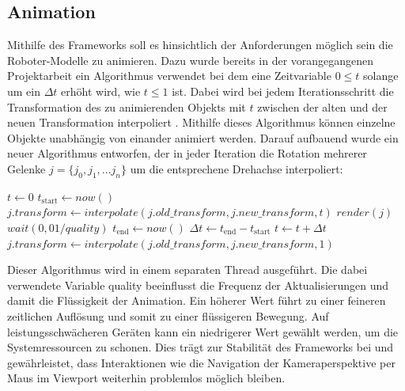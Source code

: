 \subsection{Animation}
Mithilfe des Frameworks soll es hinsichtlich der Anforderungen möglich sein die Ro\-bo\-ter-Modelle zu animieren.
Dazu wurde bereits in der vorangegangenen Projektarbeit ein Algorithmus verwendet bei dem eine
Zeitvariable $0 \leq t$ solange um ein $\Delta t$ erhöht wird, wie $t \leq 1$ ist.
Dabei wird bei jedem Iterationsschritt die Transformation des zu animierenden Objekts mit $t$ zwischen
der alten und der neuen Transformation interpoliert .
Mithilfe dieses Algorithmus können einzelne Objekte unabhängig von einander animiert werden.
Darauf aufbauend wurde ein neuer Algorithmus entworfen, der in jeder Iteration die Rotation
mehrerer Gelenke $j = \{j_0,j_1,...j_n\}$ um die entsprechene Drehachse interpoliert:

\vspace{1em}
\begin{algorithm}
    \caption{Gleichzeitige Interpolation mehrerer Gelenke}
    \begin{algorithmic}[1]
    \State $t \gets 0$
        \State $t_\text{start} \gets \mathit{now()}$
            \State $j.transform \gets \mathit{interpolate}(j.old\_transform, j.new\_transform, t)$
        \EndFor
            \State $\mathit{render}(j)$
        \EndFor
        \State $\mathit{wait}(0{,}01 / quality)$
        \State $t_\text{end} \gets \mathit{now()}$
        \State $\Delta t \gets t_\text{end} - t_\text{start}$
        \State $t \gets t + \Delta t$
    \EndWhile
        \State $j.transform \gets \mathit{interpolate}(j.old\_transform, j.new\_transform, 1)$
    \EndFor
    \end{algorithmic}
\end{algorithm}
\vspace{1em}

Dieser Algorithmus wird in einem separaten Thread ausgeführt.
Die dabei verwendete Variable quality beeinflusst die Frequenz der Aktualisierungen und damit die Flüssigkeit der Animation.
Ein höherer Wert führt zu einer feineren zeitlichen Auflösung und somit zu einer flüssigeren Bewegung.
Auf leistungsschwächeren Geräten kann ein niedrigerer Wert gewählt werden, um die Systemressourcen zu schonen.
Dies trägt zur Stabilität des Frameworks bei und gewährleistet,
dass Interaktionen wie die Navigation der Kameraperspektive per Maus im Viewport weiterhin problemlos möglich bleiben.

